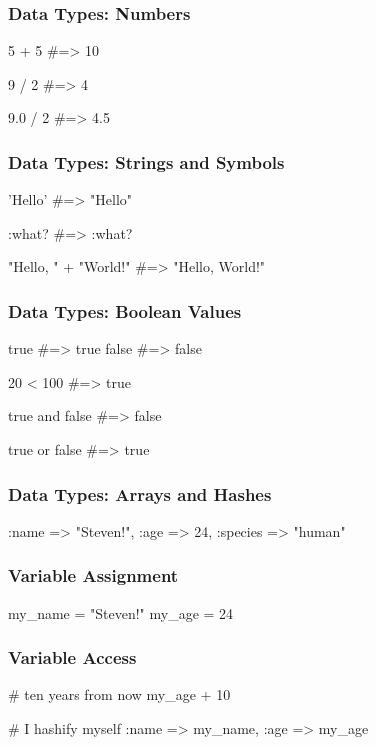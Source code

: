 \documentclass[20pt]{beamer}
\begin{document}
\begin{frame}[fragile]
\frametitle{Data Types: Numbers}
\begin{rubycode}
5 + 5 #=> 10

9 / 2 #=> 4

9.0 / 2 #=> 4.5
\end{rubycode}
\end{frame}

\begin{frame}[fragile]
\frametitle{Data Types: Strings and Symbols}
\begin{rubycode}
'Hello' #=> "Hello"

:what?  #=> :what?

"Hello, " + "World!"
#=> "Hello, World!"
\end{rubycode}
\end{frame}

\begin{frame}[fragile]
\frametitle{Data Types: Boolean Values}
\begin{rubycode}
true #=> true
false #=> false

20 < 100 #=> true

true and false #=> false

true or false #=> true
\end{rubycode}
\end{frame}

\begin{frame}[fragile]
\frametitle{Data Types: Arrays and Hashes}
\begin{rubycode}
[ 1, 2, 3.0, "four" ]

{ :name => "Steven!",
:age => 24,
:species => "human" }
\end{rubycode}
\end{frame}

\begin{frame}[fragile]
\frametitle{Variable Assignment}
\begin{rubycode}
my_name = "Steven!"
my_age = 24
\end{rubycode}
\end{frame}

\begin{frame}[fragile]
\frametitle{Variable Access}
\begin{rubycode}
# ten years from now
my_age + 10

# I hashify myself
{ :name => my_name,
  :age => my_age }
\end{rubycode}
\end{frame}
\end{document}
